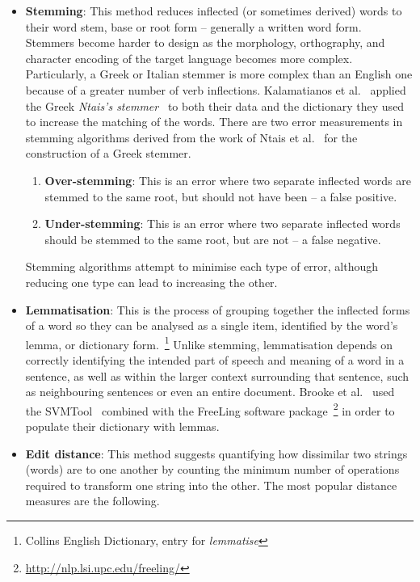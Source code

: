 \begin{itemize}
 \item \textbf{Stemming}: This method reduces inflected (or sometimes derived) words
 to their word stem, base or root form -- generally a written word form.
 Stemmers become harder to design as the morphology, orthography, and character encoding of the target language becomes more complex.
 Particularly, a Greek or Italian stemmer is more complex than an English one
 because of a greater number of verb inflections.
 Kalamatianos et al.~\cite{KMSA15} applied the Greek \emph{Ntais's stemmer}~\cite{Nta06}
 to both their data and the dictionary they used
 to increase the matching of the words.
 There are two error measurements in stemming algorithms
 derived from the work of Ntais et al.~\cite{NSBD16}
 for the construction of a Greek stemmer.

 \begin{enumerate}
  \item \textbf{Over-stemming}: This is an error where two separate inflected words
  are stemmed to the same root, but should not have been -- a false positive.
  \item \textbf{Under-stemming}: This is an error where two separate inflected words
  should be stemmed to the same root, but are not -- a false negative.
 \end{enumerate}

 Stemming algorithms attempt to minimise each type of error,
 although reducing one type can lead to increasing the other.
 
 \item \textbf{Lemmatisation}:
 This is the process of grouping together the inflected forms of a word
 so they can be analysed as a single item,
 identified by the word's lemma, or dictionary form.~\footnote{Collins English Dictionary, entry for \emph{lemmatise}}
 Unlike stemming, lemmatisation depends on correctly identifying the intended part
 of speech and meaning of a word in a sentence,
 as well as within the larger context surrounding that sentence,
 such as neighbouring sentences or even an entire document.
 Brooke et al.~\cite{BTT09} used the SVMTool~\cite{GM04}
 combined with the FreeLing software package~\footnote {\url {http://nlp.lsi.upc.edu/freeling/}}
 in order to populate their dictionary with lemmas.

 \item \textbf{Edit distance}: This method suggests quantifying
 how dissimilar two strings (words) are to one another
 by counting the minimum number of operations required
 to transform one string into the other.
 The most popular distance measures are the following.
 

\end{itemize}
